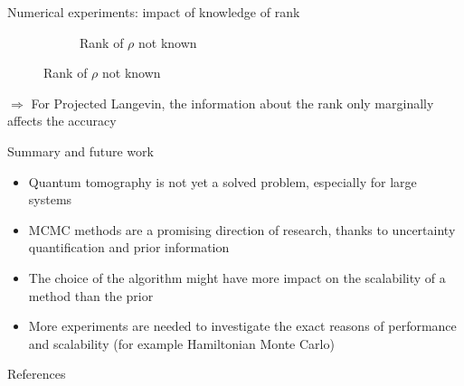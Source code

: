 \documentclass{beamer}
\begin{document}
\begin{frame}{Numerical experiments: impact of knowledge of rank}
\begin{figure}[H]
\begin{subfigure}[b]{0.49\textwidth}
            \caption{Rank of $\rho$ not known}
    
            \label{fig:rank-no-info-sub}
    
        \end{subfigure}
        
        \label{fig:rank-info}
    
    \end{figure}
    $\Longrightarrow$ For Projected Langevin, the information about the rank only marginally affects the accuracy
\end{frame}

\begin{frame}{Summary and future work}
    \begin{itemize}
        \item Quantum tomography is not yet a solved problem, especially for large  systems
        \item MCMC methods are a promising direction of research, thanks to uncertainty quantification and prior information 
        \item The choice of the algorithm might have more impact on the scalability of a method than the prior
        \item More experiments are needed to investigate the exact reasons of performance and scalability (for example Hamiltonian Monte Carlo)
    \end{itemize}
\end{frame}
\begin{frame}{References}
    \printbibliography
\end{frame}
\end{document}
